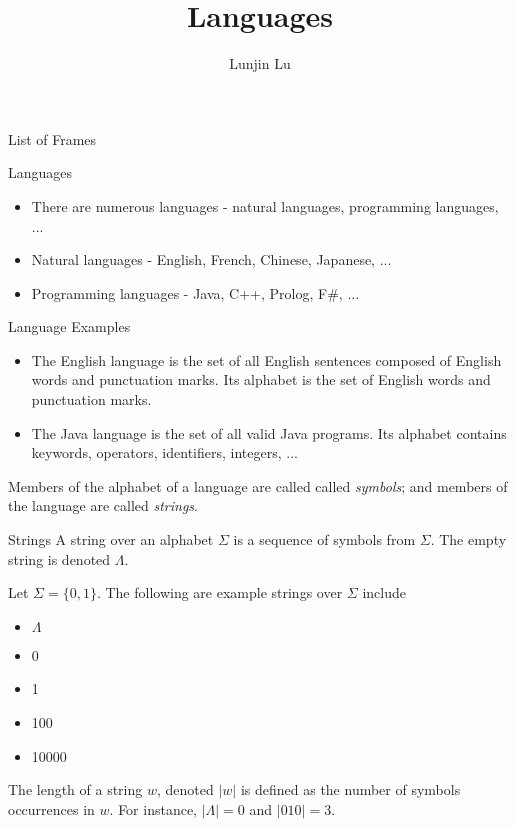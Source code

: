 \documentclass[notes=none]{beamer}
\title{Languages}
\author{Lunjin Lu}
\date{}
\makeatletter
\newif\ifframeinlbf
\newcommand\listofframes{\@starttoc{lbf}}
\makeatother
\begin{document}
\begin{comment}
\end{comment}
\frameinlbffalse
\begin{frame}{List of Frames}
    \listofframes
\end{frame}
\frameinlbftrue


\frame{ \titlepage
}

\begin{frame}{Languages}
\begin{itemize}
  \item There are numerous languages - natural languages, programming languages, ...
  \item Natural languages - English, French, Chinese, Japanese, ...
  \item Programming languages - Java, C++, Prolog, F\#, ...
\end{itemize}
\end{frame}

\begin{frame}{Language Examples}
    \begin{itemize}
    \item The English language is the set of all English sentences composed of English words and punctuation marks.  Its alphabet is the set of English words and punctuation marks.
    \item The Java language is the set of all valid Java programs. Its alphabet contains keywords, operators, identifiers, integers, ...
    \end{itemize}
    Members of the alphabet of a language are  called called \textit{symbols}; and members of the language are called \textit{strings}.
\end{frame}

\begin{frame}{Strings}
A string over an alphabet $\Sigma$ is a sequence of symbols from $\Sigma$. The empty string is denoted $\Lambda$.



Let $\Sigma = \{0,1\}$. The following are example strings over $\Sigma$ include
\begin{itemize}
    \item $\Lambda$
    \item 0
    \item 1
    \item 100
    \item 10000
\end{itemize}

The length of a string $w$, denoted $|w|$ is defined as the number of symbols occurrences in $w$. For instance, $|\Lambda|=0$ and $|010|=3$.
\end{frame}
\end{document}
